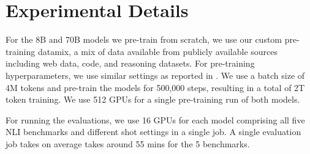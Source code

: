 \section{Experimental Details}
\label{appx:experiments}

For the 8B and 70B models we pre-train from scratch, we use our custom pre-training datamix, a mix of data available from publicly available sources including web data, code, and reasoning datasets. For pre-training hyperparameters, we use similar settings as reported in \citet{dubey2024llama}. We use a batch size of 4M tokens and pre-train the models for 500,000 steps, resulting in a total of 2T token training. We use 512 GPUs for a single pre-training run of both models.

For running the evaluations, we use 16 GPUs for each model comprising all five NLI benchmarks and different shot settings in a single job. A single evaluation job takes on average takes around 55 mins for the 5 benchmarks.
